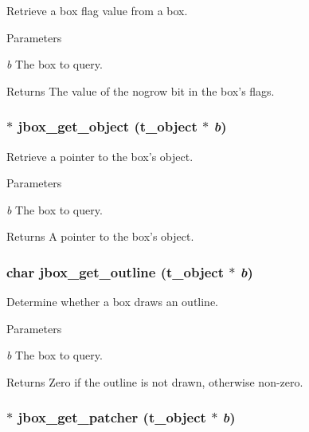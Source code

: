 Retrieve a box flag value from a box. 
\begin{DoxyParams}{Parameters}
\item[{\em b}]The box to query. \end{DoxyParams}
\begin{DoxyReturn}{Returns}
The value of the nogrow bit in the box's flags. 
\end{DoxyReturn}
\hypertarget{group__jbox_ga5063d165cfca9dc76162ff5757ea4852}{
\subsubsection[{jbox\_\-get\_\-object}]{$\ast$ jbox\_\-get\_\-object ({\bf t\_\-object} $\ast$ {\em b})}}
\label{group__jbox_ga5063d165cfca9dc76162ff5757ea4852}


Retrieve a pointer to the box's object. 
\begin{DoxyParams}{Parameters}
\item[{\em b}]The box to query. \end{DoxyParams}
\begin{DoxyReturn}{Returns}
A pointer to the box's object. 
\end{DoxyReturn}
\hypertarget{group__jbox_ga3316ca865cdfb5d3e64daba573889407}{
\subsubsection[{jbox\_\-get\_\-outline}]{\setlength{\rightskip}{0pt plus 5cm}char jbox\_\-get\_\-outline ({\bf t\_\-object} $\ast$ {\em b})}}
\label{group__jbox_ga3316ca865cdfb5d3e64daba573889407}


Determine whether a box draws an outline. 
\begin{DoxyParams}{Parameters}
\item[{\em b}]The box to query. \end{DoxyParams}
\begin{DoxyReturn}{Returns}
Zero if the outline is not drawn, otherwise non-\/zero. 
\end{DoxyReturn}
\hypertarget{group__jbox_ga628997df216439d23dac3f76cd525806}{
\subsubsection[{jbox\_\-get\_\-patcher}]{$\ast$ jbox\_\-get\_\-patcher ({\bf t\_\-object} $\ast$ {\em b})}}
\label{group__jbox_ga628997df216439d23dac3f76cd525806}


